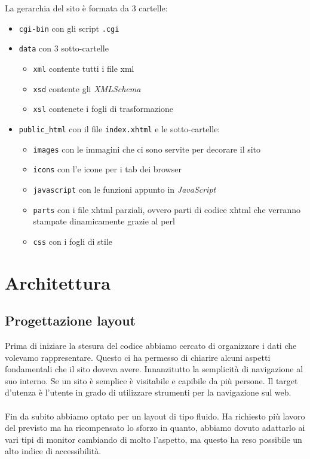 \documentclass[11pt]{article}
\begin{document}
La gerarchia del sito è formata da 3 cartelle:
\begin{itemize}
	\item \texttt{cgi-bin} con gli script \texttt{.cgi}
	\item \texttt{data} con 3 sotto-cartelle
	\begin{itemize}
		\item \texttt{xml} contente tutti i file xml
		\item \texttt{xsd} contente gli \textit{XMLSchema}
		\item \texttt{xsl} contenete i fogli di trasformazione
	\end{itemize}
	\item \texttt{public\_html} con il file \texttt{index.xhtml} e le sotto-cartelle:
	\begin{itemize}
		\item \texttt{images} con le immagini che ci sono servite per decorare il sito
		\item \texttt{icons} con l'e icone per i tab dei browser
		\item \texttt{javascript} con le funzioni appunto in \textit{JavaScript}
		\item \texttt{parts} con i file xhtml parziali, ovvero parti di codice xhtml che verranno stampate dinamicamente grazie al perl
		\item \texttt{css} con i fogli di stile  
	\end{itemize}
\end{itemize}
\newpage
\section{Architettura}
\subsection{Progettazione layout}
Prima di iniziare la stesura del codice abbiamo cercato di organizzare i dati che volevamo rappresentare. Questo ci ha permesso di chiarire alcuni aspetti fondamentali che il sito doveva avere. Innanzitutto la semplicità di navigazione al suo interno. Se un sito è semplice è visitabile e capibile da più persone. Il target d'utenza è l'utente in grado di utilizzare strumenti per la navigazione sul web.
\\
\\
Fin da subito abbiamo optato per un layout di tipo fluido. Ha richiesto più lavoro del previsto ma ha ricompensato lo sforzo in quanto, abbiamo dovuto adattarlo ai vari tipi di monitor cambiando di molto l'aspetto, ma questo ha reso possibile un alto indice di accessibilità.
\end{document}
